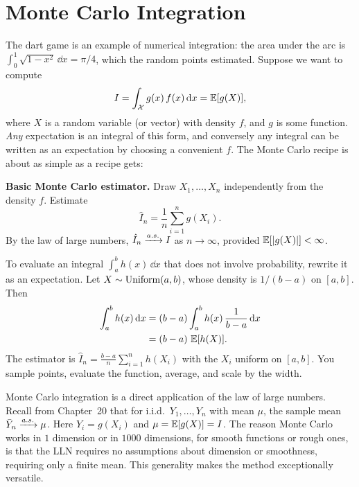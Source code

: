 \section{Monte Carlo Integration}
\label{ch35:integration}
The dart game is an example of numerical integration: the area under the arc is
$\int_0^1 \sqrt{1-x^2}\,\dd x = \pi/4$, which the random points estimated.
Suppose we want to compute
\[
  I = \int_{\mathcal X} g(x)\, f(x)\, \mathrm{d} x = \operatorname{\mathbb{E}}[g(X)],
\]
where $X$ is a random variable (or vector) with density $f$, and $g$ is some
function. \emph{Any} expectation is an integral of this form, and conversely any
integral can be written as an expectation by choosing a convenient $f$. The
Monte Carlo recipe is about as simple as a recipe gets:
\begin{formalbox}
\textbf{Basic Monte Carlo estimator.} Draw $X_1,\dots,X_n$ independently from the
density $f$. Estimate
\[
  \hat I_n = \frac1n \sum_{i=1}^n g(X_i).
\]
By the law of large numbers, $\hat I_n \xrightarrow{a.s.} I$ as $n\to\infty$, provided
$\operatorname{\mathbb{E}}[\lvert g(X)\rvert] < \infty$.
\end{formalbox}
To evaluate an integral $\int_a^b h(x)\,\dd x$ that does not involve probability,
rewrite it as an expectation. Let $X\sim\operatorname{Uniform}(a,b)$, whose density is $1/(b-a)$ on $[a,b]$.
Then
\begin{align*}
  \int_a^b h(x)\,\mathrm{d} x &= (b-a)\int_a^b h(x)\,\frac{1}{b-a}\,\mathrm{d} x \\
  &= (b-a)\,\operatorname{\mathbb{E}}[h(X)].
\end{align*}
The estimator is $\hat I_n = \frac{b-a}{n}\sum_{i=1}^n h(X_i)$ with the
$X_i$ uniform on $[a,b]$. You sample points, evaluate the function, average, and
scale by the width.
\begin{connectionbox}
Monte Carlo integration is a direct application of the law of large numbers.
Recall from Chapter~20 that for i.i.d.\ $Y_1,\dots,Y_n$ with mean $\mu$, the
sample mean $\bar Y_n \xrightarrow{a.s.} \mu$. Here $Y_i = g(X_i)$ and $\mu = \operatorname{\mathbb{E}}[g(X)] = I$.
The reason Monte Carlo works in $1$ dimension or in
$1000$ dimensions, for smooth functions or rough ones, is that the LLN requires
no assumptions about dimension or smoothness, requiring only a finite mean.
This generality makes the method exceptionally versatile.
\end{connectionbox}
